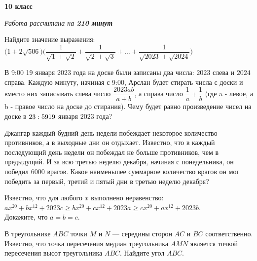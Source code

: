 \hspace{3mm}

\centerline{\bf \huge 10 класс}
\centerline{\normalsize{\it Работа рассчитана на \bf{210} минут}}

\hspace{3mm}

 Найдите значение выражения: \\

$\Biggl(1 + 2\sqrt{506}\Biggl) \Biggl( \dfrac{1}{\sqrt{1} + \sqrt{2}}+\dfrac{1}{\sqrt{2} + \sqrt{3}}+\dotsc+\dfrac{1}{\sqrt{2023} + \sqrt{2024}}\Biggr)$

\hspace{3mm}

В 9:00 19 января $2023$ года на доске были записаны два числа: $2023$ слева и $2024$ справа. Каждую минуту, начиная с 9:00, Арслан будет стирать числа с доски и вместо них записывать слева число $\dfrac{2023ab}{a+b}$, а справа число $\dfrac{1}{a} + \dfrac{1}{b}$ (где a - левое, а b - правое число на доске до стирания). Чему будет равно произведение чисел на доске в $23:59 \\ 19$ января $2023$ года?

Джангар каждый будний день недели побеждает некоторое количество противников, а в выходные дни он отдыхает. Известно, что в каждый последующий день недели он побеждал не больше противников, чем в предыдущий. И за всю третью неделю декабря, начиная с понедельника, он победил 6000 врагов. Какое наименьшее суммарное количество врагов он мог победить за первый, третий и пятый дни в третью неделю декабря?

Известно, что для любого $x$ выполнено неравенство:\\ $ax^{20} + bx^{12} + 2023c \geq bx^{20} + cx^{12} + 2023a \geq cx^{20} + ax^{12} + 2023b$.\\ Докажите, что $a = b = c.$

\hspace{3mm}

 В треугольнике $ABC$ точки $M$ и $N$ — середины сторон $AC$ и $BC$ соответственно. Известно,
что точка пересечения медиан треугольника $AMN$ является точкой пересечения высот треугольника
$ABC$. Найдите угол $ABC$.

